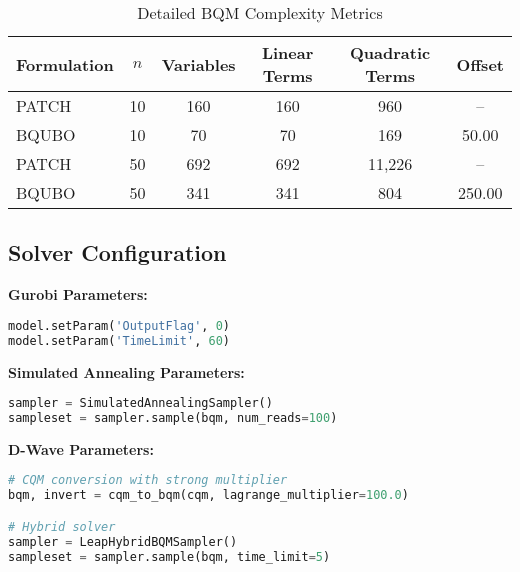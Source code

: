 \documentclass[11pt,a4paper]{article}
\begin{document}
\begin{table}[h]
\centering
\caption{Detailed BQM Complexity Metrics}
\begin{tabular}{@{}lccccc@{}}
\toprule
\textbf{Formulation} & \textbf{$n$} & \textbf{Variables} & \textbf{Linear Terms} & \textbf{Quadratic Terms} & \textbf{Offset} \\
\midrule
PATCH  & 10 & 160 & 160 & 960   & -- \\
BQUBO  & 10 & 70  & 70  & 169   & 50.00 \\
PATCH  & 50 & 692 & 692 & 11,226 & -- \\
BQUBO  & 50 & 341 & 341 & 804    & 250.00 \\
\bottomrule
\end{tabular}
\end{table}

\subsection{Solver Configuration}

\textbf{Gurobi Parameters:}
\begin{lstlisting}[language=Python]
model.setParam('OutputFlag', 0)
model.setParam('TimeLimit', 60)
\end{lstlisting}

\textbf{Simulated Annealing Parameters:}
\begin{lstlisting}[language=Python]
sampler = SimulatedAnnealingSampler()
sampleset = sampler.sample(bqm, num_reads=100)
\end{lstlisting}

\textbf{D-Wave Parameters:}
\begin{lstlisting}[language=Python]
# CQM conversion with strong multiplier
bqm, invert = cqm_to_bqm(cqm, lagrange_multiplier=100.0)

# Hybrid solver
sampler = LeapHybridBQMSampler()
sampleset = sampler.sample(bqm, time_limit=5)
\end{lstlisting}
\end{document}
